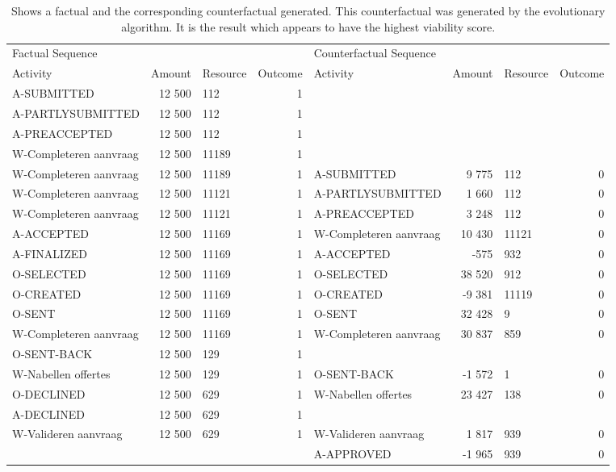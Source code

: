 \begin{table}
\caption{Shows a factual and the corresponding counterfactual generated. This counterfactual was generated by the evolutionary algorithm. It is the result which appears to have the highest viability score.}
\label{tbl:example-cf-evo}
\begin{tabular}{lrlrlrlr}
\toprule
\multicolumn{4}{l}{Factual Sequence} & \multicolumn{4}{l}{Counterfactual Sequence} \\
Activity & Amount & Resource & Outcome & Activity & Amount & Resource & Outcome \\
\midrule
A-SUBMITTED & 12 500 & 112 & 1 &  &  &  &  \\
A-PARTLYSUBMITTED & 12 500 & 112 & 1 &  &  &  &  \\
A-PREACCEPTED & 12 500 & 112 & 1 &  &  &  &  \\
W-Completeren aanvraag & 12 500 & 11189 & 1 &  &  &  &  \\
W-Completeren aanvraag & 12 500 & 11189 & 1 & A-SUBMITTED & 9 775 & 112 & 0 \\
W-Completeren aanvraag & 12 500 & 11121 & 1 & A-PARTLYSUBMITTED & 1 660 & 112 & 0 \\
W-Completeren aanvraag & 12 500 & 11121 & 1 & A-PREACCEPTED & 3 248 & 112 & 0 \\
A-ACCEPTED & 12 500 & 11169 & 1 & W-Completeren aanvraag & 10 430 & 11121 & 0 \\
A-FINALIZED & 12 500 & 11169 & 1 & A-ACCEPTED & -575 & 932 & 0 \\
O-SELECTED & 12 500 & 11169 & 1 & O-SELECTED & 38 520 & 912 & 0 \\
O-CREATED & 12 500 & 11169 & 1 & O-CREATED & -9 381 & 11119 & 0 \\
O-SENT & 12 500 & 11169 & 1 & O-SENT & 32 428 & 9 & 0 \\
W-Completeren aanvraag & 12 500 & 11169 & 1 & W-Completeren aanvraag & 30 837 & 859 & 0 \\
O-SENT-BACK & 12 500 & 129 & 1 &  &  &  &  \\
W-Nabellen offertes & 12 500 & 129 & 1 & O-SENT-BACK & -1 572 & 1 & 0 \\
O-DECLINED & 12 500 & 629 & 1 & W-Nabellen offertes & 23 427 & 138 & 0 \\
A-DECLINED & 12 500 & 629 & 1 &  &  &  &  \\
W-Valideren aanvraag & 12 500 & 629 & 1 & W-Valideren aanvraag & 1 817 & 939 & 0 \\
 &  &  &  & A-APPROVED & -1 965 & 939 & 0 \\
\bottomrule
\end{tabular}
\end{table}
